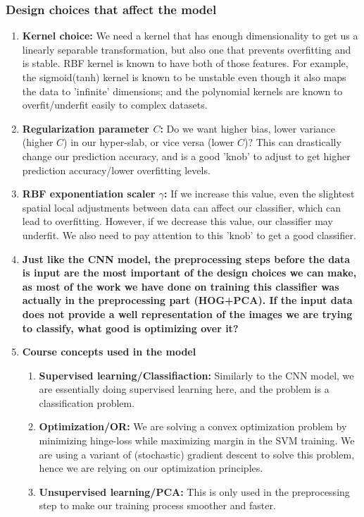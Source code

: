 \documentclass[10pt]{article} %
\begin{document}
\subsubsection{Design choices that affect the model}\begin{enumerate}
    \item \textbf{Kernel choice:} We need a kernel that has enough dimensionality to get us a linearly separable transformation, but also one that prevents overfitting and is stable. RBF kernel is known to have both of those features. For example, the sigmoid(tanh) kernel is known to be unstable even though it also maps the data to 'infinite' dimensions; and the polynomial kernels are known to overfit/underfit easily to complex datasets.
    \item \textbf{Regularization parameter $C$:} Do we want higher bias, lower variance (higher $C$) in our hyper-slab, or vice versa (lower $C$)? This can drastically change our prediction accuracy, and is a good 'knob' to adjust to get higher prediction accuracy/lower overfitting levels.
    \item \textbf{RBF exponentiation scaler $\gamma$:} If we increase this value, even the slightest spatial local adjustments between data can affect our classifier, which can lead to overfitting. However, if we decrease this value, our classifier may underfit. We also need to pay attention to this 'knob' to get a good classifier.
    \item \textbf{Just like the CNN model, the preprocessing steps before the data is input are the most important of the design choices we can make, as most of the work we have done on training this classifier was actually in the preprocessing part (HOG+PCA). If the input data does not provide a well representation of the images we are trying to classify, what good is optimizing over it?}
    \item \textbf{Course concepts used in the model}\begin{enumerate}
        \item \textbf{Supervised learning/Classifiaction:} Similarly to the CNN model, we are essentially doing supervised learning here, and the problem is a classification problem.
        \item \textbf{Optimization/OR:} We are solving a convex optimization problem by minimizing hinge-loss while maximizing margin in the SVM training. We are using a variant of (stochastic) gradient descent to solve this problem, hence we are relying on our optimization principles.
        \item \textbf{Unsupervised learning/PCA:} This is only used in the preprocessing step to make our training process smoother and faster.

\end{enumerate}
\end{enumerate}
\end{document}
